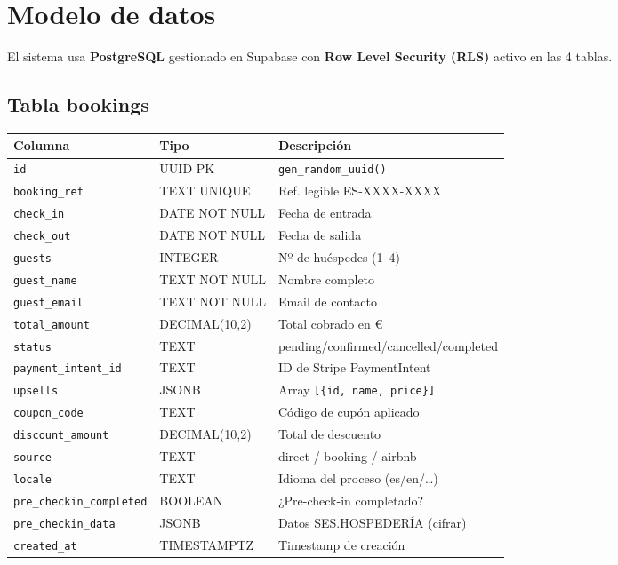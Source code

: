 \documentclass[12pt,a4paper,twoside,openright]{report}
\begin{document}
\section{Modelo de datos}

El sistema usa \textbf{PostgreSQL} gestionado en Supabase con
\textbf{Row Level Security (RLS)} activo en las 4 tablas.

\subsection{Tabla bookings}

\begin{longtable}{L{4.2cm} L{3.5cm} L{5cm}}
  \toprule
  \textbf{Columna} & \textbf{Tipo} & \textbf{Descripción} \\
  \midrule
  \texttt{id} & UUID PK & \texttt{gen\_random\_uuid()} \\
  \texttt{booking\_ref} & TEXT UNIQUE & Ref. legible ES-XXXX-XXXX \\
  \texttt{check\_in} & DATE NOT NULL & Fecha de entrada \\
  \texttt{check\_out} & DATE NOT NULL & Fecha de salida \\
  \texttt{guests} & INTEGER & Nº de huéspedes (1--4) \\
  \texttt{guest\_name} & TEXT NOT NULL & Nombre completo \\
  \texttt{guest\_email} & TEXT NOT NULL & Email de contacto \\
  \texttt{total\_amount} & DECIMAL(10,2) & Total cobrado en \euro{} \\
  \texttt{status} & TEXT & pending/confirmed/cancelled/completed \\
  \texttt{payment\_intent\_id} & TEXT & ID de Stripe PaymentIntent \\
  \texttt{upsells} & JSONB & Array \texttt{[\{id, name, price\}]} \\
  \texttt{coupon\_code} & TEXT & Código de cupón aplicado \\
  \texttt{discount\_amount} & DECIMAL(10,2) & Total de descuento \\
  \texttt{source} & TEXT & direct / booking / airbnb \\
  \texttt{locale} & TEXT & Idioma del proceso (es/en/\ldots) \\
  \texttt{pre\_checkin\_completed} & BOOLEAN & ¿Pre-check-in completado? \\
  \texttt{pre\_checkin\_data} & JSONB & Datos SES.HOSPEDERÍA (cifrar) \\
  \texttt{created\_at} & TIMESTAMPTZ & Timestamp de creación \\
  \bottomrule
\end{longtable}
\end{document}
